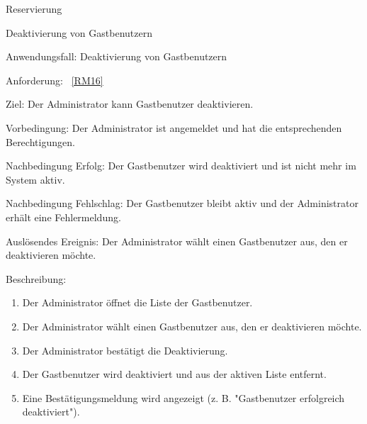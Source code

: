 \begin{function}{20}{Reservierung}
\begin{function}{50}{Deaktivierung von Gastbenutzern}
    \item[Anwendungsfall:] Deaktivierung von Gastbenutzern
    \item[Anforderung:] ~\ref{RM16}
    \item[Ziel:] Der Administrator kann Gastbenutzer deaktivieren.
    \item[Vorbedingung:] Der Administrator ist angemeldet und hat die entsprechenden Berechtigungen.
    \item[Nachbedingung Erfolg:] Der Gastbenutzer wird deaktiviert und ist nicht mehr im System aktiv.
    \item[Nachbedingung Fehlschlag:] Der Gastbenutzer bleibt aktiv und der Administrator erhält eine Fehlermeldung.
    \item[Auslösendes Ereignis:] Der Administrator wählt einen Gastbenutzer aus, den er deaktivieren möchte.
    \item[Beschreibung:] ~
    \begin{enumerate}
        \item Der Administrator öffnet die Liste der Gastbenutzer.
        \item Der Administrator wählt einen Gastbenutzer aus, den er deaktivieren möchte.
        \item Der Administrator bestätigt die Deaktivierung.
        \item Der Gastbenutzer wird deaktiviert und aus der aktiven Liste entfernt.
        \item Eine Bestätigungsmeldung wird angezeigt (z. B. "Gastbenutzer erfolgreich deaktiviert").
    \end{enumerate}
\end{function}


\end{function}
